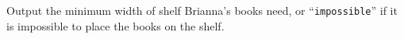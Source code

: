 
    Output the minimum width of shelf Brianna's books need, or ``\texttt{impossible}'' if it is impossible to place the books on the shelf.
